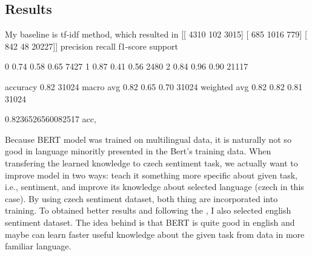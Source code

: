 \subsection{Results}

My baseline is tf-idf method, which resulted in 
[[ 4310   102  3015]
 [  685  1016   779]
 [  842    48 20227]]
              precision    recall  f1-score   support

           0       0.74      0.58      0.65      7427
           1       0.87      0.41      0.56      2480
           2       0.84      0.96      0.90     21117

    accuracy                           0.82     31024
   macro avg       0.82      0.65      0.70     31024
weighted avg       0.82      0.82      0.81     31024

0.8236526560082517 acc,


Because BERT model was trained on multilingual data, it is naturally not so good in language minoritly presented in the Bert's training data. When transfering the learned knowledge to czech sentiment task, we actually want to improve model in two ways: teach it something more specific about given task, i.e., sentiment, and improve its knowledge about selected language (czech in this case). By using czech sentiment dataset, both thing are incorporated into training. To obtained better results and following the \citep{Putra}, I also selected english sentiment dataset. The idea behind is that BERT is quite good in english and maybe can learn faster useful knowledge about the given task from data in more familiar language.














